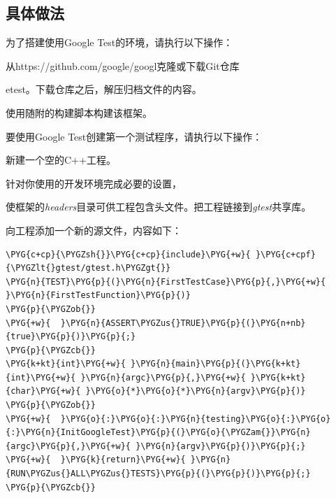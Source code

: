 \subsection{具体做法}



为了搭建使用Google Test的环境，请执行以下操作：



从https://\allowbreak{}github.\allowbreak{}com/\allowbreak{}google/\allowbreak{}googl克隆或下载Git仓库



etest。下载仓库之后，解压归档文件的内容。



使用随附的构建脚本构建该框架。



要使用Google Test创建第一个测试程序，请执行以下操作：



新建一个空的C++工程。



针对你使用的开发环境完成必要的设置，



使框架的\textit{headers}目录可供工程包含头文件。把工程链接到\textit{gtest}共享库。



向工程添加一个新的源文件，内容如下：



\begin{codeblockbg}
\begin{Verbatim}[commandchars=\\\{\},breaklines=true,breakanywhere=true,fontsize=\codefont,xleftmargin=17bp]
\PYG{c+cp}{\PYGZsh{}}\PYG{c+cp}{include}\PYG{+w}{ }\PYG{c+cpf}{\PYGZlt{}gtest/gtest.h\PYGZgt{}}
\PYG{n}{TEST}\PYG{p}{(}\PYG{n}{FirstTestCase}\PYG{p}{,}\PYG{+w}{ }\PYG{n}{FirstTestFunction}\PYG{p}{)}
\PYG{p}{\PYGZob{}}
\PYG{+w}{  }\PYG{n}{ASSERT\PYGZus{}TRUE}\PYG{p}{(}\PYG{n+nb}{true}\PYG{p}{)}\PYG{p}{;}
\PYG{p}{\PYGZcb{}}
\PYG{k+kt}{int}\PYG{+w}{ }\PYG{n}{main}\PYG{p}{(}\PYG{k+kt}{int}\PYG{+w}{ }\PYG{n}{argc}\PYG{p}{,}\PYG{+w}{ }\PYG{k+kt}{char}\PYG{+w}{ }\PYG{o}{*}\PYG{o}{*}\PYG{n}{argv}\PYG{p}{)}
\PYG{p}{\PYGZob{}}
\PYG{+w}{  }\PYG{o}{:}\PYG{o}{:}\PYG{n}{testing}\PYG{o}{:}\PYG{o}{:}\PYG{n}{InitGoogleTest}\PYG{p}{(}\PYG{o}{\PYGZam{}}\PYG{n}{argc}\PYG{p}{,}\PYG{+w}{ }\PYG{n}{argv}\PYG{p}{)}\PYG{p}{;}
\PYG{+w}{  }\PYG{k}{return}\PYG{+w}{ }\PYG{n}{RUN\PYGZus{}ALL\PYGZus{}TESTS}\PYG{p}{(}\PYG{p}{)}\PYG{p}{;}
\PYG{p}{\PYGZcb{}}
\end{Verbatim}
\end{codeblockbg}


